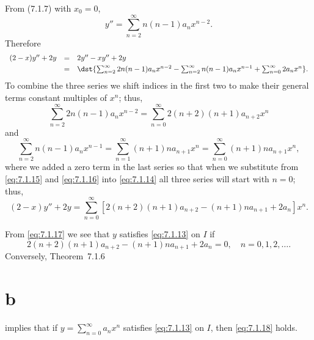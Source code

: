 \begin{examplesolution}
 From \textup{(7.1.7)} with $x_{0}=0$,
\[
  y''=\sum_{n=2}^{\infty}n(n-1)a_{n}x^{n-2}.
\]
Therefore
\begin{equation}
  \label{eq:7.1.14}
  \begin{array}{rcl}
    (2-x)y''+2y & = & 2y''-xy''+2y                                                                                                          \\[\jot]
                & = & \dst{\sum_{n=2}^{\infty}2n(n-1)a_{n}x^{n-2} -\sum_{n=2}^{\infty}n(n-1)a_{n}x^{n-1} +\sum_{n=0}^{\infty}2a_{n}x^{n}}.
  \end{array}
\end{equation}
To combine the three series we shift indices in the first two to make their general terms constant
multiples of $x^{n}$; thus,
\begin{equation}
  \label{eq:7.1.15}\sum_{n=2}^{\infty}2n(n-1)a_{n}x^{n-2}=\sum_{n=0}^{\infty}2(n+2)(n+1)a_{n+2}x^{n}
\end{equation}
and
\begin{equation}
  \label{eq:7.1.16}\sum_{n=2}^{\infty}n(n-1)a_{n}x^{n-1}=\sum_{n=1}^{\infty}(n+1)na_{n+1}x^{n}=\sum_{n=0}^{\infty}(n+1)na_{n+1}x^{n},
\end{equation}
where we added a zero term in the last series so that when we substitute from \eqref{eq:7.1.15} and
\eqref{eq:7.1.16} into \eqref{eq:7.1.14} all three series will start with $n=0$; thus,
\begin{equation}
  \label{eq:7.1.17}(2-x)y''+2y=\sum_{n=0}^{\infty}[2(n+2)(n+1)a_{n+2}-(n+1)na_{n+1}+2a_{n}]x^{n}.
\end{equation}

 From \eqref{eq:7.1.17} we see that $y$ satisfies \eqref{eq:7.1.13} on $I$ if
\begin{equation}
  \label{eq:7.1.18}2(n+2)(n+1)a_{n+2}-(n+1)na_{n+1}+2a_{n}=0,\quad n=0,1,2,\dots.
\end{equation}
Conversely, Theorem~7.1.6~\part{b} implies that if $y=\sum_{n=0}^{\infty}a_{n}x^{n}$
satisfies \eqref{eq:7.1.13} on $I$, then \eqref{eq:7.1.18} holds.
\end{examplesolution}

